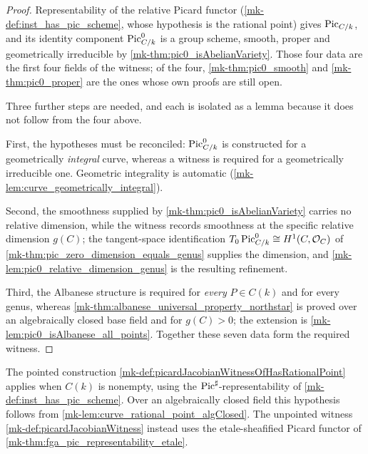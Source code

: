 \begin{proof}
  Representability of the relative Picard functor
  (\ref{mk-def:inst_has_pic_scheme}, whose hypothesis is the rational point) gives
  \(\operatorname{Pic}_{C/k}\), and its identity component \(\operatorname{Pic}^0_{C/k}\) is a group scheme,
  smooth, proper and geometrically irreducible by
  \ref{mk-thm:pic0_isAbelianVariety}. Those four data are the first four fields of
  the witness; of the four, \ref{mk-thm:pic0_smooth} and \ref{mk-thm:pic0_proper} are
  the ones whose own proofs are still open.

  Three further steps are needed, and each is isolated as a lemma because it does
  not follow from the four above.

  First, the hypotheses must be reconciled: \(\operatorname{Pic}^0_{C/k}\) is constructed for a
  geometrically \emph{integral} curve, whereas a witness is required for a
  geometrically irreducible one. Geometric integrality is automatic
  (\ref{mk-lem:curve_geometrically_integral}).

  Second, the smoothness supplied by \ref{mk-thm:pic0_isAbelianVariety} carries no
  relative dimension, while the witness records smoothness at the specific
  relative dimension \(g(C)\); the tangent-space identification
  \(T_0\operatorname{Pic}^0_{C/k}\cong H^1(C,\mathcal O_C)\) of
  \ref{mk-thm:pic_zero_dimension_equals_genus} supplies the dimension, and
  \ref{mk-lem:pic0_relative_dimension_genus} is the resulting refinement.

  Third, the Albanese structure is required for \emph{every} \(P\in C(k)\) and for
  every genus, whereas \ref{mk-thm:albanese_universal_property_northstar} is proved
  over an algebraically closed base field and for \(g(C) > 0\); the extension is
  \ref{mk-lem:pic0_isAlbanese_all_points}. Together these seven data form the
  required witness.
\end{proof}

\begin{remark}
  \label{mk-rem:pointed_witness_scope}
  The pointed construction \ref{mk-def:picardJacobianWitnessOfHasRationalPoint}
  applies when \(C(k)\) is nonempty, using the \(\operatorname{Pic}^\sharp\)-representability
  of \ref{mk-def:inst_has_pic_scheme}.  Over an algebraically closed field this
  hypothesis follows from \ref{mk-lem:curve_rational_point_algClosed}.
  The unpointed witness \ref{mk-def:picardJacobianWitness} instead uses the
  etale-sheafified Picard functor of \ref{mk-thm:fga_pic_representability_etale}.
\end{remark}

